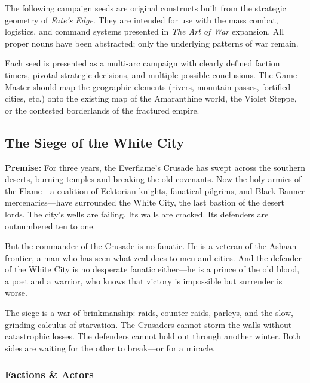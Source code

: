 \documentclass[11pt]{article}
\begin{document}
The following campaign seeds are original constructs built from the strategic geometry of \textit{Fate's Edge}. They are intended for use with the mass combat, logistics, and command systems presented in \textit{The Art of War} expansion. All proper nouns have been abstracted; only the underlying patterns of war remain.

Each seed is presented as a multi-arc campaign with clearly defined faction timers, pivotal strategic decisions, and multiple possible conclusions. The Game Master should map the geographic elements (rivers, mountain passes, fortified cities, etc.) onto the existing map of the Amaranthine world, the Violet Steppe, or the contested borderlands of the fractured empire.

\subsection{The Siege of the White City}

\textbf{Premise:} For three years, the Everflame's Crusade has swept across the southern deserts, burning temples and breaking the old covenants. Now the holy armies of the Flame—a coalition of Ecktorian knights, fanatical pilgrims, and Black Banner mercenaries—have surrounded the White City, the last bastion of the desert lords. The city's wells are failing. Its walls are cracked. Its defenders are outnumbered ten to one.

But the commander of the Crusade is no fanatic. He is a veteran of the Ashaan frontier, a man who has seen what zeal does to men and cities. And the defender of the White City is no desperate fanatic either—he is a prince of the old blood, a poet and a warrior, who knows that victory is impossible but surrender is worse.

The siege is a war of brinkmanship: raids, counter-raids, parleys, and the slow, grinding calculus of starvation. The Crusaders cannot storm the walls without catastrophic losses. The defenders cannot hold out through another winter. Both sides are waiting for the other to break—or for a miracle.

\subsubsection{Factions \& Actors}
\end{document}
